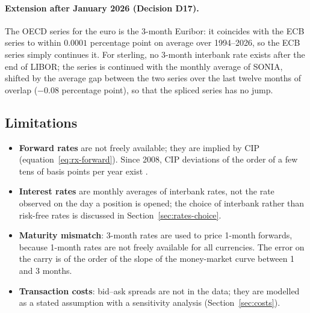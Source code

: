 \paragraph{Extension after January 2026 (Decision D17).}
The OECD series for the euro is the 3-month Euribor: it coincides with the ECB series to within $0.0001$ percentage point on average over 1994--2026, so the ECB series simply continues it.
For sterling, no 3-month interbank rate exists after the end of LIBOR; the series is continued with the monthly average of SONIA, shifted by the average gap between the two series over the last twelve months of overlap ($-0.08$ percentage point), so that the spliced series has no jump.

\subsection{Limitations}
\begin{itemize}
  \item \textbf{Forward rates} are not freely available; they are implied by CIP (equation~\ref{eq:rx-forward}). Since 2008, CIP deviations of the order of a few tens of basis points per year exist \citep{du2018}.
  \item \textbf{Interest rates} are monthly averages of interbank rates, not the rate observed on the day a position is opened; the choice of interbank rather than risk-free rates is discussed in Section~\ref{sec:rates-choice}.
  \item \textbf{Maturity mismatch}: 3-month rates are used to price 1-month forwards, because 1-month rates are not freely available for all currencies. The error on the carry is of the order of the slope of the money-market curve between 1 and 3 months.
  \item \textbf{Transaction costs}: bid--ask spreads are not in the data; they are modelled as a stated assumption with a sensitivity analysis (Section~\ref{sec:costs}).
\end{itemize}
